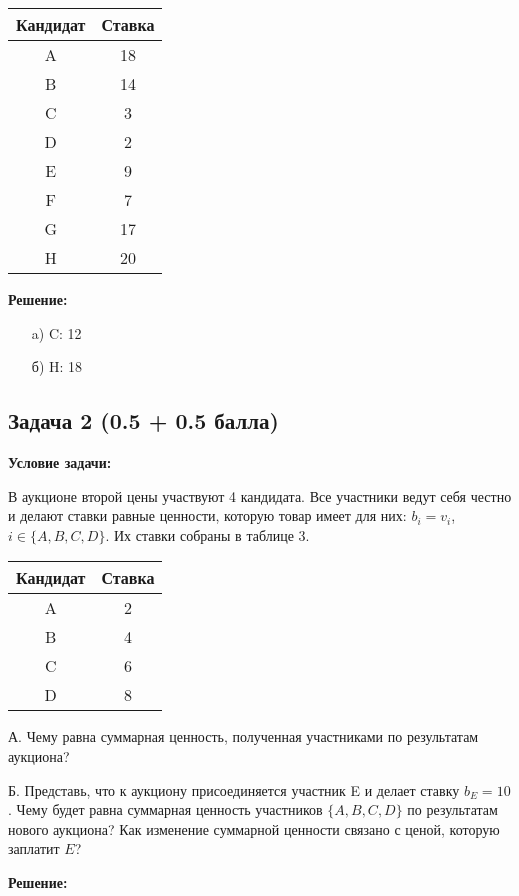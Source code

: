 \documentclass[a4paper,12pt]{article}
\begin{document}
\begin{center}
\begin{tabular}{|c|c|}
\hline
Кандидат & Ставка \\
\hline
A & 18 \\
B & 14 \\
C & 3 \\
D & 2 \\
E & 9 \\
F & 7 \\
G & 17 \\
H & 20 \\
\hline
\end{tabular}
\end{center}

\textbf{Решение:}
\begin{itemize}
    \item [a)] C: 12
    \item [б)] H: 18
\end{itemize}

\vspace{1cm}

\subsection{Задача 2 (0.5 + 0.5 балла)}
\textbf{Условие задачи:}

В аукционе второй цены участвуют 4 кандидата. Все участники ведут себя честно и делают ставки равные ценности, которую товар имеет для них: $b_i = v_i$, $i \in \{A,B,C,D\}$. Их ставки собраны в таблице 3.

\begin{center}
\begin{tabular}{|c|c|}
\hline
Кандидат & Ставка \\
\hline
A & 2 \\
B & 4 \\
C & 6 \\
D & 8 \\
\hline
\end{tabular}
\end{center}

А. Чему равна суммарная ценность, полученная участниками по результатам аукциона?

Б. Представь, что к аукциону присоединяется участник E и делает ставку $b_E = 10$. Чему будет равна суммарная ценность участников $\{A,B,C,D\}$ по результатам нового аукциона? Как изменение суммарной ценности связано с ценой, которую заплатит $E$?

\textbf{Решение:}
\end{document}
